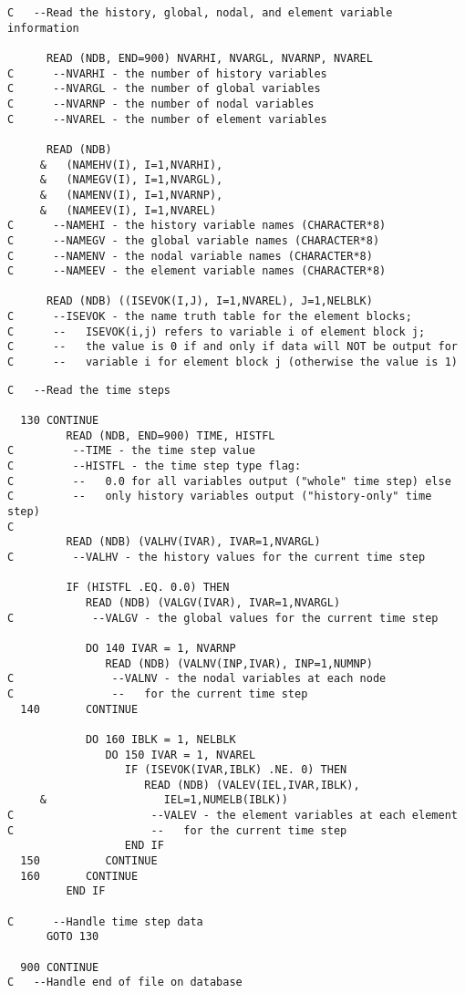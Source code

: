 \newpage
\begin{verbatim}
C   --Read the history, global, nodal, and element variable information

      READ (NDB, END=900) NVARHI, NVARGL, NVARNP, NVAREL
C      --NVARHI - the number of history variables
C      --NVARGL - the number of global variables
C      --NVARNP - the number of nodal variables
C      --NVAREL - the number of element variables

      READ (NDB)
     &   (NAMEHV(I), I=1,NVARHI),
     &   (NAMEGV(I), I=1,NVARGL),
     &   (NAMENV(I), I=1,NVARNP),
     &   (NAMEEV(I), I=1,NVAREL)
C      --NAMEHI - the history variable names (CHARACTER*8)
C      --NAMEGV - the global variable names (CHARACTER*8)
C      --NAMENV - the nodal variable names (CHARACTER*8)
C      --NAMEEV - the element variable names (CHARACTER*8)

      READ (NDB) ((ISEVOK(I,J), I=1,NVAREL), J=1,NELBLK)
C      --ISEVOK - the name truth table for the element blocks;
C      --   ISEVOK(i,j) refers to variable i of element block j;
C      --   the value is 0 if and only if data will NOT be output for
C      --   variable i for element block j (otherwise the value is 1)
\end{verbatim}
\newpage
\begin{verbatim}
C   --Read the time steps

  130 CONTINUE
         READ (NDB, END=900) TIME, HISTFL
C         --TIME - the time step value
C         --HISTFL - the time step type flag:
C         --   0.0 for all variables output ("whole" time step) else
C         --   only history variables output ("history-only" time step)
C
         READ (NDB) (VALHV(IVAR), IVAR=1,NVARGL)
C         --VALHV - the history values for the current time step

         IF (HISTFL .EQ. 0.0) THEN
            READ (NDB) (VALGV(IVAR), IVAR=1,NVARGL)
C            --VALGV - the global values for the current time step

            DO 140 IVAR = 1, NVARNP
               READ (NDB) (VALNV(INP,IVAR), INP=1,NUMNP)
C               --VALNV - the nodal variables at each node
C               --   for the current time step
  140       CONTINUE

            DO 160 IBLK = 1, NELBLK
               DO 150 IVAR = 1, NVAREL
                  IF (ISEVOK(IVAR,IBLK) .NE. 0) THEN
                     READ (NDB) (VALEV(IEL,IVAR,IBLK),
     &                  IEL=1,NUMELB(IBLK))
C                     --VALEV - the element variables at each element
C                     --   for the current time step
                  END IF
  150          CONTINUE
  160       CONTINUE
         END IF

C      --Handle time step data
      GOTO 130

  900 CONTINUE
C   --Handle end of file on database
\end{verbatim}
